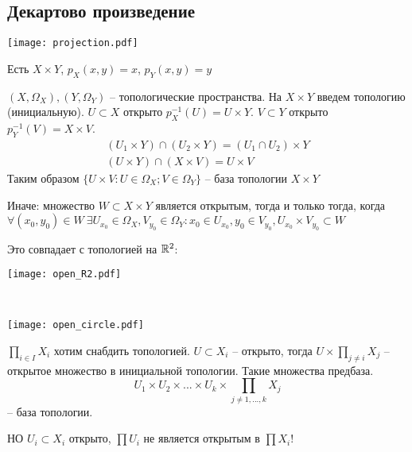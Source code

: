 \documentclass[main]{subfiles}
\begin{document}
\subsection{Декартово произведение}

\begin{center}
    \texttt{[image: projection.pdf]}
\end{center}
Есть $X \times Y$, $p_X(x,y) = x$, $p_Y(x,y)=y$

$(X, \Omega_X), (Y, \Omega_Y)$ -- топологические пространства.
На $X\times Y$ введем топологию (инициальную).
$U \subset X$ открыто $p_X^{-1}(U) = U \times Y$.
$V \subset Y$ открыто $p_Y^{-1}(V) = X \times V$.
\begin{gather*}
    (U_1 \times Y) \cap (U_2 \times Y) = (U_1 \cap U_2) \times Y\\
    (U \times Y) \cap (X\times V)  = U \times V
\end{gather*}
Таким образом $\{U \times V : U \in \Omega_X; V \in \Omega_Y\}$ -- база топологии $X\times Y$

Иначе: множество $W \subset X\times Y$ является открытым, тогда и только тогда, когда
$\forall (x_0, y_0) \in W\ \exists U_{x_0} \in \Omega_X, V_{y_0} \in \Omega_Y: x_0 \in U_{x_0},
    y_0 \in V_{y_0}, U_{x_0} \times V_{y_0} \subset W$

\begin{example}
    Это совпадает с топологией на $\mathbb{R}^2$:
    \begin{center}
        \texttt{[image: open\_R2.pdf]}
    \end{center}
\end{example}
\begin{example}
    \

    \begin{center}
        \texttt{[image: open\_circle.pdf]}
    \end{center}
\end{example}


$\prod_{i \in I} X_i$ хотим снабдить топологией.
$U \subset X_i$ -- открыто, тогда $U \times \prod_{j \neq i} X_j$ -- открытое
множество в инициальной топологии. Такие множества предбаза.
\[U_1 \times U_2 \times ... \times U_k \times \prod_{j \neq 1, ..., k} X_j\]
--  база топологии.

НО $U_i \subset X_i$ открыто, $\prod U_i$ не является открытым в $\prod X_i$!
\end{document}
